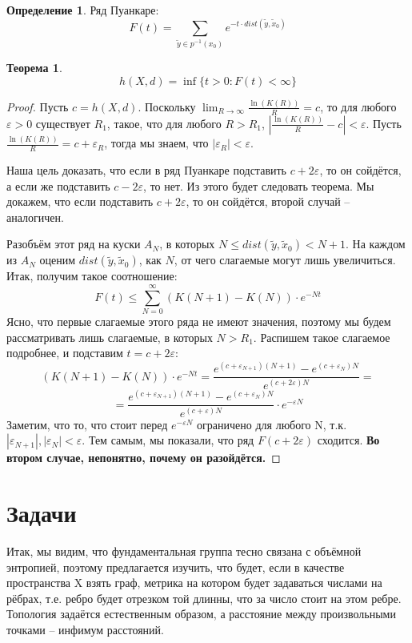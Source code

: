 \documentclass[11pt]{article}
\theoremstyle{definition}
\newtheorem{defin}{Определение}%
\theoremstyle{plain}
\theoremstyle{plain}
\newtheorem{theorem}{Теорема}
\def\leq{\leqslant}
\def\wt#1{\widetilde{#1}}
\def\eps{\varepsilon}
\begin{document}
\begin{defin}
Ряд Пуанкаре:
$$
  F(t) = \sum_{\wt{y} \in p^{-1}(x_0)} e^{-t \cdot dist(\wt{y}, \wt{x}_0)}
$$
\end{defin}

\begin{theorem}
$$
h(X,d) = \inf \{t>0: F(t) < \infty\}
$$
\end{theorem}

\begin{proof}
Пусть $c = h(X, d)$. Поскольку $\lim_{R \rightarrow \infty} \frac{\ln (K(R))} {R} = c$, то для любого $\eps > 0$ 
существует $R_1$, такое, что для любого $R > R_1$, $\left|\frac{\ln (K(R))} {R} - c\right| < \eps$.
Пусть $\frac{\ln (K(R))} {R} = c + \eps_R$, тогда мы знаем, что $|\eps_R| < \eps$.

Наша цель доказать, что если в ряд Пуанкаре подставить $c + 2\eps$, то он сойдётся, а если же подставить $c - 2\eps$, то нет. 
Из этого будет следовать теорема. Мы докажем, что если подставить $c + 2\eps$, то он сойдётся, второй случай -- аналогичен.

Разобъём этот ряд на куски $A_N$, в которых $N \leq dist(\wt{y}, \wt{x}_0) < N+1$. На каждом из $A_N$ оценим $dist(\wt{y}, \wt{x}_0)$, как $N$, 
от чего слагаемые могут лишь увеличиться. Итак, получим такое соотношение:
$$
F(t) \leq \sum_{N=0}^{\infty} (K(N+1)-K(N))\cdot e^{-Nt}
$$
Ясно, что первые слагаемые этого ряда не имеют значения, поэтому мы будем рассматривать лишь слагаемые, в которых $N > R_1$.
Распишем такое слагаемое подробнее, и подставим $t = c + 2\eps$:
$$
(K(N+1)-K(N))\cdot e^{-Nt} = \frac{e^{(c + \eps_{N+1})(N+1)} - e^{(c + \eps_{N})N}}  {e^{(c+2\eps)N}} = 
$$
$$
= \frac{e^{(c + \eps_{N+1})(N+1)} - e^{(c + \eps_{N})N}}  {e^{(c+\eps)N}} \cdot e^{-\eps N}
$$
Заметим, что то, что стоит перед $e^{-\eps N}$ ограничено для любого N, т.к. $|\eps_{N+1}|, |\eps_{N}| < \eps$. 
Тем самым, мы показали, что ряд $F(c+2\eps)$ сходится.
{\bf Во втором случае, непонятно, почему он разойдётся.}





\end{proof}

\section{Задачи}
Итак, мы видим, что фундаментальная группа тесно связана с объёмной энтропией, поэтому предлагается изучить, что будет, 
если в качестве пространства X взять граф, метрика на котором будет задаваться числами на рёбрах, 
т.е. ребро будет отрезком той длинны, что за число стоит на этом ребре. Топология задаётся естественным образом, 
а расстояние между произвольными точками -- инфимум расстояний.
\end{document}
